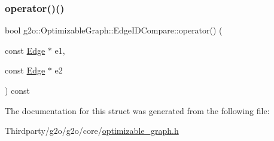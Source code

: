 \subsubsection{\texorpdfstring{operator()()}{operator()()}}
{\footnotesize\ttfamily bool g2o\+::\+Optimizable\+Graph\+::\+Edge\+I\+D\+Compare\+::operator() (\begin{DoxyParamCaption}\item[{const \mbox{\hyperlink{classg2o_1_1_optimizable_graph_1_1_edge}{Edge}} $\ast$}]{e1,  }\item[{const \mbox{\hyperlink{classg2o_1_1_optimizable_graph_1_1_edge}{Edge}} $\ast$}]{e2 }\end{DoxyParamCaption}) const\hspace{0.3cm}{\ttfamily [inline]}}



The documentation for this struct was generated from the following file\+:\begin{DoxyCompactItemize}
\item 
Thirdparty/g2o/g2o/core/\mbox{\hyperlink{optimizable__graph_8h}{optimizable\+\_\+graph.\+h}}\end{DoxyCompactItemize}
